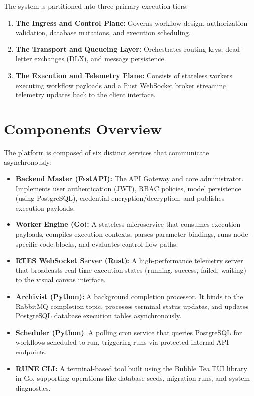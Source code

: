 \documentclass[12pt]{report}
\begin{document}
The system is partitioned into three primary execution tiers:
\begin{enumerate}
    \item \textbf{The Ingress and Control Plane:} Governs workflow design, authorization validation, database mutations, and execution scheduling.
    \item \textbf{The Transport and Queueing Layer:} Orchestrates routing keys, dead-letter exchanges (DLX), and message persistence.
    \item \textbf{The Execution and Telemetry Plane:} Consists of stateless workers executing workflow payloads and a Rust WebSocket broker streaming telemetry updates back to the client interface.
\end{enumerate}

\section{Components Overview}
The platform is composed of six distinct services that communicate asynchronously:
\begin{itemize}
    \item \textbf{Backend Master (FastAPI):} The API Gateway and core administrator. Implements user authentication (JWT), RBAC policies, model persistence (using PostgreSQL), credential encryption/decryption, and publishes execution payloads.
    \item \textbf{Worker Engine (Go):} A stateless microservice that consumes execution payloads, compiles execution contexts, parses parameter bindings, runs node-specific code blocks, and evaluates control-flow paths.
    \item \textbf{RTES WebSocket Server (Rust):} A high-performance telemetry server that broadcasts real-time execution states (running, success, failed, waiting) to the visual canvas interface.
    \item \textbf{Archivist (Python):} A background completion processor. It binds to the RabbitMQ completion topic, processes terminal status updates, and updates PostgreSQL database execution tables asynchronously.
    \item \textbf{Scheduler (Python):} A polling cron service that queries PostgreSQL for workflows scheduled to run, triggering runs via protected internal API endpoints.
    \item \textbf{RUNE CLI:} A terminal-based tool built using the Bubble Tea TUI library in Go, supporting operations like database seeds, migration runs, and system diagnostics.
\end{itemize}
\end{document}
